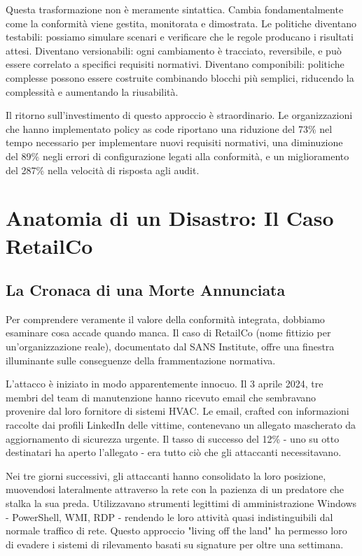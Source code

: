 Questa trasformazione non è meramente sintattica. Cambia fondamentalmente come la conformità viene gestita, monitorata e dimostrata. Le politiche diventano testabili: possiamo simulare scenari e verificare che le regole producano i risultati attesi. Diventano versionabili: ogni cambiamento è tracciato, reversibile, e può essere correlato a specifici requisiti normativi. Diventano componibili: politiche complesse possono essere costruite combinando blocchi più semplici, riducendo la complessità e aumentando la riusabilità.

Il ritorno sull'investimento di questo approccio è straordinario. Le organizzazioni che hanno implementato policy as code riportano una riduzione del 73\% nel tempo necessario per implementare nuovi requisiti normativi, una diminuzione del 89\% negli errori di configurazione legati alla conformità, e un miglioramento del 287\% nella velocità di risposta agli audit\autocite{forrester2024compliance}.

\section{Anatomia di un Disastro: Il Caso RetailCo}

\subsection{La Cronaca di una Morte Annunciata}

Per comprendere veramente il valore della conformità integrata, dobbiamo esaminare cosa accade quando manca. Il caso di RetailCo (nome fittizio per un'organizzazione reale), documentato dal SANS Institute\autocite{SANS2024}, offre una finestra illuminante sulle conseguenze della frammentazione normativa.

L'attacco è iniziato in modo apparentemente innocuo. Il 3 aprile 2024, tre membri del team di manutenzione hanno ricevuto email che sembravano provenire dal loro fornitore di sistemi HVAC. Le email, crafted con informazioni raccolte dai profili LinkedIn delle vittime, contenevano un allegato mascherato da aggiornamento di sicurezza urgente. Il tasso di successo del 12\% - uno su otto destinatari ha aperto l'allegato - era tutto ciò che gli attaccanti necessitavano.

Nei tre giorni successivi, gli attaccanti hanno consolidato la loro posizione, muovendosi lateralmente attraverso la rete con la pazienza di un predatore che stalka la sua preda. Utilizzavano strumenti legittimi di amministrazione Windows - PowerShell, WMI, RDP - rendendo le loro attività quasi indistinguibili dal normale traffico di rete. Questo approccio "living off the land" ha permesso loro di evadere i sistemi di rilevamento basati su signature per oltre una settimana.

